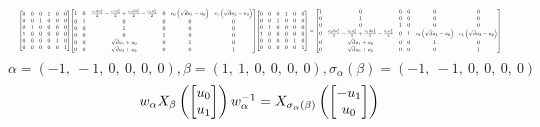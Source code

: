 \documentclass[11pt]{article}
\theoremstyle{definition}
\begin{document}
\[
\scaletoalign{\textwidth}{{\left[\begin{matrix}0 & 0 & 0 & 1 & 0 & 0\\0 & 0 & 1 & 0 & 0 & 0\\0 & 1 & 0 & 0 & 0 & 0\\1 & 0 & 0 & 0 & 0 & 0\\0 & 0 & 0 & 0 & 1 & 0\\0 & 0 & 0 & 0 & 0 & 1\end{matrix}\right]} {\left[\begin{matrix}1 & 0 & \frac{c_{0} d u_{1}^{2}}{2} - \frac{c_{0} u_{0}^{2}}{2} + \frac{c_{1} d u_{3}^{2}}{2} - \frac{c_{1} u_{2}^{2}}{2} & 0 & c_{0} \left(\sqrt{d} u_{1} - u_{0}\right) & c_{1} \left(\sqrt{d} u_{3} - u_{2}\right)\\0 & 1 & 0 & 0 & 0 & 0\\0 & 0 & 1 & 0 & 0 & 0\\0 & 0 & 0 & 1 & 0 & 0\\0 & 0 & \sqrt{d} u_{1} + u_{0} & 0 & 1 & 0\\0 & 0 & \sqrt{d} u_{3} + u_{2} & 0 & 0 & 1\end{matrix}\right]} {\left[\begin{matrix}0 & 0 & 0 & 1 & 0 & 0\\0 & 0 & 1 & 0 & 0 & 0\\0 & 1 & 0 & 0 & 0 & 0\\1 & 0 & 0 & 0 & 0 & 0\\0 & 0 & 0 & 0 & 1 & 0\\0 & 0 & 0 & 0 & 0 & 1\end{matrix}\right]} = {\left[\begin{matrix}1 & 0 & 0 & 0 & 0 & 0\\0 & 1 & 0 & 0 & 0 & 0\\0 & 0 & 1 & 0 & 0 & 0\\0 & \frac{c_{0} d u_{1}^{2}}{2} - \frac{c_{0} u_{0}^{2}}{2} + \frac{c_{1} d u_{3}^{2}}{2} - \frac{c_{1} u_{2}^{2}}{2} & 0 & 1 & c_{0} \left(\sqrt{d} u_{1} - u_{0}\right) & c_{1} \left(\sqrt{d} u_{3} - u_{2}\right)\\0 & \sqrt{d} u_{1} + u_{0} & 0 & 0 & 1 & 0\\0 & \sqrt{d} u_{3} + u_{2} & 0 & 0 & 0 & 1\end{matrix}\right]}}
\]
\[
\alpha = \left( -1, \  -1, \  0, \  0, \  0, \  0\right), \beta = \left( 1, \  1, \  0, \  0, \  0, \  0\right), \sigma_{\alpha}(\beta) = \left( -1, \  -1, \  0, \  0, \  0, \  0\right)
\]
\[
\scaletoalign{\textwidth}{w_{\alpha} X_{\beta}\left(\left[\begin{matrix}u_{0}\\u_{1}\end{matrix}\right]\right) w_{\alpha}^{-1} = X_{\sigma_{\alpha}\left(\beta\right)}\left(\left[\begin{matrix}- u_{1}\\u_{0}\end{matrix}\right]\right)}
\]
\end{document}
